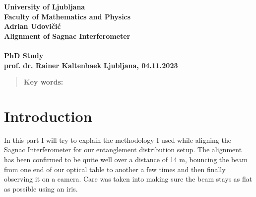 \documentclass{article}
\begin{document}
\begin{titlepage}
	\begin{center}
		{\large \textbf{University of Ljubljana}} \\[0.1cm]
		{\large \textbf{Faculty of Mathematics and Physics}}
		\\[0.5cm]
		\vspace{2cm}
		{\LARGE \textbf{Adrian Udovičić}}\\[2.5cm]
		{\Huge \textbf{Alignment of Sagnac Interferometer}}\\[0.5cm]
		{\Huge \textbf{ }}\\[2cm]
		{\LARGE\textbf{PhD Study}}\\[2.5cm]
		\vspace{1.5cm}
		\hfill \large\textbf{prof. dr. Rainer Kaltenbaek}
		\vfill
		\large\textbf{{Ljubljana, 04.11.2023}}
	\end{center}
\end{titlepage}

\newpage
{}
\tableofcontents
\newpage
{}
\begin{abstract}
	\textbf{Key words:}
\end{abstract}
\newpage
{}
\section{Introduction}
In this part I will try to explain the methodology I used while aligning the Sagnac Interferometer for our entanglement distribution setup.
The alignment has been confirmed to be quite well over a distance of 14 m, bouncing the beam from one end of our optical table to another
a few times and then finally observing it on a camera. Care was taken into making sure the beam stays as flat as possible using an iris.


\newpage


\listoftables
\listoffigures
\end{document}

